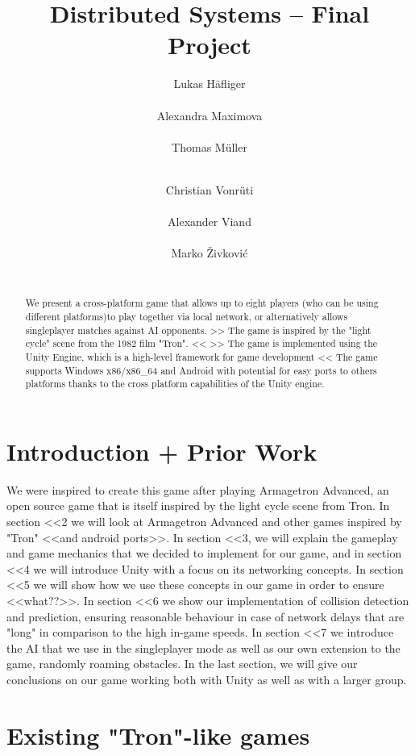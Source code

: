 \documentclass{report}
\title{Distributed Systems -- Final Project}
\author{
%
%
\alignauthor Lukas Häfliger\\
	\affaddr{ETH ID 11-916-376}\\
	\email{haelukas@student.ethz.ch}
\alignauthor Alexandra Maximova\\
 	\affaddr{ETH ID 09-913-534}\\
 	\email{amaximov@student.ethz.ch}
 	\alignauthor Thomas Müller\\
 	\affaddr{ETH ID 11-946-936}\\
 	\email{muelltho@student.ethz.ch} 
\and  %
\alignauthor Christian Vonrüti\\
 	\affaddr{ETH ID 11-930-914}\\
 	\email{cvonruet@student.ethz.ch} 
\alignauthor Alexander Viand\\
	\affaddr{ETH ID 09-940-131}\\
	\email{vianda@student.ethz.ch}
\alignauthor Marko Živković\\
	\affaddr{ETH ID 10-921-211}\\
	\email{markoz@student.ethz.ch}
}
\begin{document}
\maketitle

\begin{abstract}
We present a cross-platform game that allows up to eight players (who can be using different platforms)to play together via local network, 
or alternatively allows singleplayer matches against AI opponents.
>> The game is inspired by the "light cycle" scene from the 1982 film "Tron". <<
>> The game is implemented using the Unity Engine, which is a high-level framework for game development << 
The game supports Windows x86/x86\_64 and Android with potential for easy ports to others platforms thanks to the cross platform capabilities of the Unity engine.

\end{abstract}

\section{Introduction + Prior Work}

We were inspired to create this game after playing Armagetron Advanced, an open source game that is itself inspired by the light cycle scene from Tron. 
In section <<2 we will look at Armagetron Advanced and other games inspired by "Tron" <<and android ports>>.
In section <<3, we will explain the gameplay and game mechanics that we decided to implement for our game, and in  section <<4 we will introduce Unity with a focus on its networking concepts. In section <<5 we will show how we use these concepts in our game in order to ensure <<what??>>.
In section <<6 we show our implementation of collision detection and prediction, ensuring reasonable behaviour in case of network delays that are "long" in comparison to the high in-game speeds.
In section <<7 we introduce the AI that we use in the singleplayer mode as well as our own extension to the game,  randomly roaming obstacles.
In the last section, we will give our conclusions on our game working both with Unity as well as with a larger group.

 
\section{Existing "Tron"-like games}
\end{document}
